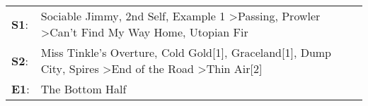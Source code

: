 \begin{supertabular}{p{0.03\textwidth}p{0.92\textwidth}}
 \textbf{S1}:  &           Sociable Jimmy\textsuperscript{}, \enspace 2nd Self\textsuperscript{}, \enspace Example 1\textsuperscript{} \textgreater \enspace Passing\textsuperscript{}, \enspace Prowler\textsuperscript{} \textgreater \enspace Can't Find My Way Home\textsuperscript{}, \enspace Utopian Fir\textsuperscript{}  \enspace  \\
 \textbf{S2}:  &  Miss Tinkle's Overture\textsuperscript{}, \enspace Cold Gold[1]\textsuperscript{}, \enspace Graceland[1]\textsuperscript{}, \enspace Dump City\textsuperscript{}, \enspace Spires\textsuperscript{} \textgreater \enspace End of the Road\textsuperscript{} \textgreater \enspace Thin Air[2]\textsuperscript{}  \enspace  \\
 \textbf{E1}:  &                                                                                                                                                                                                                                                                                The Bottom Half\textsuperscript{}  \enspace  \\
\end{supertabular}
